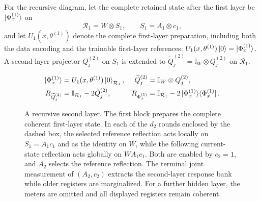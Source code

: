 \documentclass[pdflatex,sn-mathphys,NameDate,iicol]{sn-jnl}
\newcommand{\id}{\mathbb{I}}
\newcommand{\proj}[1]{\ket{#1}\!\bra{#1}}
\begin{document}
For the recursive diagram, let the complete retained state after the first
layer be $\ket{\Phi_x^{(1)}}$ on
\begin{equation}
 \mathcal R_1=W\otimes S_1,
 \qquad
 S_1=A_1\otimes c_1,
 \label{eq:app-retained-partition}
\end{equation}
and let $U_1(x,\theta^{(1)})$ denote the complete first-layer preparation,
including both the data encoding and the trainable first-layer references:
$U_1(x,\theta^{(1)})\ket0=\ket{\Phi_x^{(1)}}$. A second-layer projector
$Q_j^{(2)}$ on $S_1$ is extended to
$\widetilde Q_j^{(2)}=\id_W\otimes Q_j^{(2)}$ on $\mathcal R_1$.

\begin{figure}[t]
\centering
{}%
\vspace{1mm}
\begin{align*}
 \ket{\Phi_x^{(1)}}
   &=U_1(x,\theta^{(1)})\ket0_{\mathcal R_1},
 &
 \widetilde Q_j^{(2)}
   &=\id_W\otimes Q_j^{(2)},
 \\
 R_{\widetilde Q_j^{(2)}}
   &=\id_{\mathcal R_1}-2\widetilde Q_j^{(2)},
 &
 R_{\Phi_x^{(1)}}
   &=\id_{\mathcal R_1}-2\proj{\Phi_x^{(1)}}.
\end{align*}
\caption{A recursive second layer. The first block prepares the complete
coherent first-layer state. In each of the $d_2$ rounds enclosed by the dashed
box, the selected reference reflection acts locally on $S_1=A_1c_1$ and as
the identity on $W$, while the following current-state reflection acts
globally on $WA_1c_1$. Both are enabled by $c_2=1$, and $A_2$ selects the
reference reflection. The terminal joint measurement of $(A_2,c_2)$ extracts
the second-layer response bank while older registers are marginalized. For a
further hidden layer, the meters are omitted and all displayed registers
remain coherent.}
\label{fig:qfnn-two-layer}
\end{figure}
\end{document}
